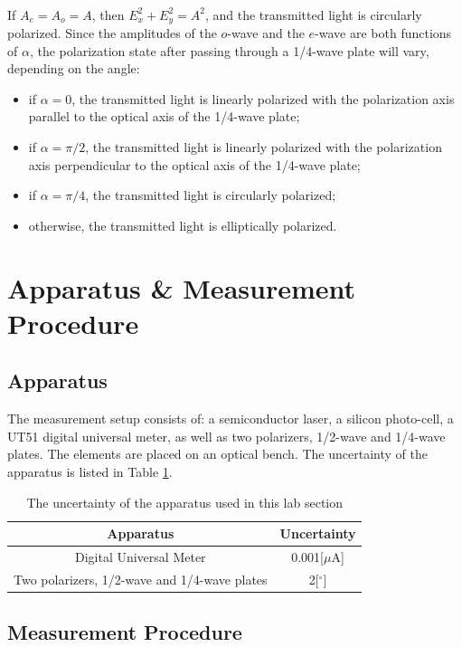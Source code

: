 \documentclass{my_template}
\begin{document}
    \paragraph{}If $A_e=A_o=A$, then $E^2_x + E^2_y = A^2$, and the transmitted light is circularly polarized. Since the amplitudes of the $o$-wave and the $e$-wave are both functions of $\alpha$, the polarization state after passing through a 1/4-wave plate will vary, depending on the angle: 
    \begin{itemize}
        \item if $\alpha = 0$, the transmitted light is linearly polarized with the polarization axis parallel to the optical axis of the 1/4-wave plate;
        \item if $\alpha=\pi/2$, the transmitted light is linearly polarized with the polarization axis perpendicular to the optical axis of the 1/4-wave plate;
        \item if $\alpha=\pi/4$, the transmitted light is circularly polarized;
        \item otherwise, the transmitted light is elliptically polarized.
    \end{itemize}
    \section{Apparatus \& Measurement Procedure}
    \subsection{Apparatus}
    The measurement setup consists of: a semiconductor laser, a silicon photo-cell, a UT51 digital universal meter, as well as two polarizers, 1/2-wave and 1/4-wave plates. The elements are placed on an optical bench. The uncertainty of the apparatus is listed in Table \ref{tab:uncertainty}.
    \begin{table}[!ht]
        \centering
        \begin{tabular}{|c|c|}
            \hline
            Apparatus&Uncertainty\\\hline
            Digital Universal Meter&0.001[$\mu$A]\\\hline
            Two polarizers, 1/2-wave and 1/4-wave plates&2[$^\circ$]\\\hline
        \end{tabular}
        \caption{The uncertainty of the apparatus used in this lab section}
        \label{tab:uncertainty}
    \end{table}
    \subsection{Measurement Procedure}
\end{document}
